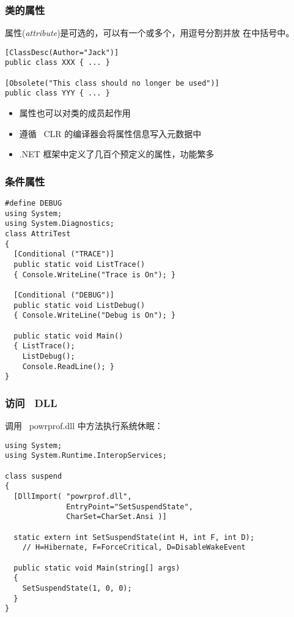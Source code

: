 \begin{frame}[fragile]
\frametitle{类的属性}
\CJKindent 属性(\textit{attribute})是可选的，可以有一个或多个，用逗号分割并放
在中括号中。

\begin{lstlisting}
[ClassDesc(Author="Jack")]
public class XXX { ... }

[Obsolete("This class should no longer be used")]
public class YYY { ... }

\end{lstlisting}
\pause

\begin{itemize}
\item 属性也可以对类的成员起作用
\item 遵循 ~CLR 的编译器会将属性信息写入元数据中
\item .NET 框架中定义了几百个预定义的属性，功能繁多
\end{itemize}
\end{frame}

\begin{frame}[fragile]
\frametitle{条件属性}
\begin{lstlisting}
#define DEBUG
using System;
using System.Diagnostics;
class AttriTest
{
  [Conditional ("TRACE")]
  public static void ListTrace()
  { Console.WriteLine("Trace is On"); }

  [Conditional ("DEBUG")]
  public static void ListDebug()
  { Console.WriteLine("Debug is On"); }

  public static void Main()
  { ListTrace();
    ListDebug();
    Console.ReadLine(); }
}
\end{lstlisting}
\end{frame}

\begin{frame}[fragile]
\frametitle{访问 ~DLL}
调用 ~powrprof.dll 中方法执行系统休眠：
\begin{lstlisting}
using System;
using System.Runtime.InteropServices;

class suspend
{
  [DllImport( "powrprof.dll",
              EntryPoint="SetSuspendState",
              CharSet=CharSet.Ansi )]

  static extern int SetSuspendState(int H, int F, int D);
    // H=Hibernate, F=ForceCritical, D=DisableWakeEvent

  public static void Main(string[] args)
  {
    SetSuspendState(1, 0, 0);
  }
}
\end{lstlisting}
\end{frame}


